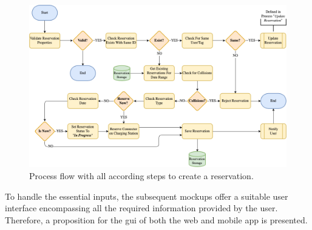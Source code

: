 \begin{figure}[h]
    \centering
    \includegraphics[scale=0.4]{resources/images/main/5_design/processes/ReservationCreate.png}
    \caption{Process flow with all according steps to create a reservation.}
    \label{fig:create-reservation-flowchart}
\end{figure}

\noindent To handle the essential inputs, the subsequent mockups offer a suitable user interface encompassing all the required information provided by the user. Therefore, a proposition for the \acrshort{gui} of both the web and mobile app is presented.

